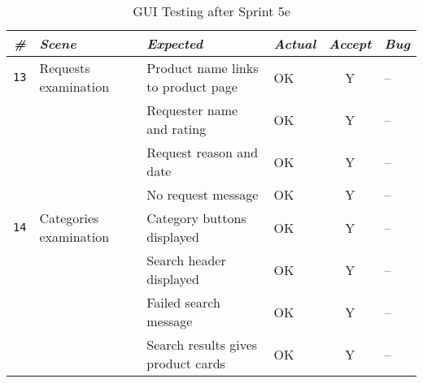\begin{sidewaystable}
\centering
    \begin{tabularx}{\textwidth}{cbbbcb}
    \toprule
    \centering
    \emph{\textbf{\#}} & \emph{\textbf{Scene}} & \emph{\textbf{Expected}} & \emph{\textbf{Actual}} & \emph{\textbf{Accept}} & \emph{\textbf{Bug}} \\
    \midrule
    \texttt{13}
    		& Requests examination
    		& Product name links to product page
    		& OK
    		& Y
    		& -- \\
    		\cline{3-6} \noalign{\smallskip}
    		&& Requester name and rating
    		& OK
    		& Y
    		& --\\
    		\cline{3-6} \noalign{\smallskip}
    		&& Request reason and date
    		& OK
    		& Y
    		& --\\
    		\cline{3-6} \noalign{\smallskip}
    		&& No request message
    		& OK
    		& Y
    		& --\\
    	\midrule
    \texttt{14}
    		& Categories examination
    		& Category buttons displayed
    		& OK
    		& Y
    		& -- \\
    		\cline{3-6} \noalign{\smallskip}
    		&& Search header displayed
    		& OK
    		& Y
    		& --\\
    		\cline{3-6} \noalign{\smallskip}
    		&& Failed search message
    		& OK
    		& Y
    		& --\\
    		\cline{3-6} \noalign{\smallskip}
    		&& Search results gives product cards
    		& OK
    		& Y
    		& --\\
    \bottomrule
    \hline
    \end{tabularx}
    \caption{GUI Testing after Sprint 5e}
    \label{table:table:gui-test5}
\end{sidewaystable}



















